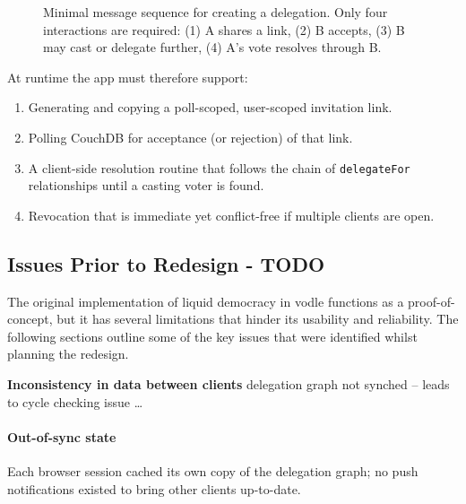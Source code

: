 \begin{figure}[H]
  \centering
  \caption{Minimal message sequence for creating a delegation. Only four interactions are required: (1) A shares a link, (2) B accepts, (3) B may cast or delegate further, (4) A's vote resolves through B.}
  \label{fig:delegation-flow}
\end{figure}

At runtime the app must therefore support:
\begin{enumerate}
  \item Generating and copying a poll-scoped, user-scoped invitation link.
  \item Polling CouchDB for acceptance (or rejection) of that link.
  \item A client-side resolution routine that follows the chain of \texttt{delegateFor} relationships until a casting voter is found.
  \item Revocation that is immediate yet conflict-free if multiple clients are open.
\end{enumerate}

\subsection{Issues Prior to Redesign - TODO}
The original implementation of liquid democracy in vodle functions as a proof-of-concept, but it has several limitations that hinder its usability and reliability. The following sections outline some of the key issues that were identified whilst planning the redesign.

\textbf{Inconsistency in data between clients} delegation graph not synched -- leads to cycle checking issue \dots

\paragraph{Out-of-sync state} Each browser session cached its own copy of the delegation graph; no push notifications existed to bring other clients up-to-date.
